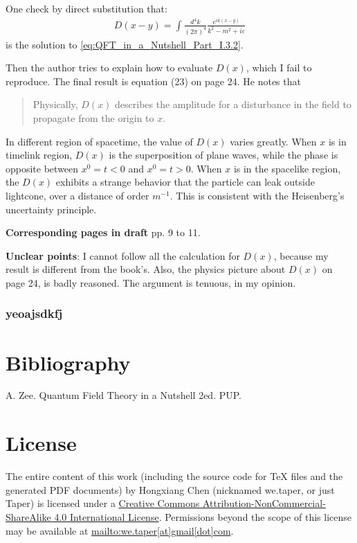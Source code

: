 \documentclass{book}
\numberwithin{equation}{subsection} %
\theoremstyle{definition}
\begin{document}
One check by direct substitution that:
\begin{align}
    D(x-y) = \int \frac{d^4k}{(2\pi)^4} 
        \frac{e^{ik(x-y)}}{k^2-m^2+i\varepsilon}
\end{align}
is the solution to \ref{eq:QFT_in_a_Nutshell_Part_I.3.2}.

Then the author tries to explain how to evaluate $D(x)$, which
I fail to reproduce. The final result is equation (23) on page 
24. He notes that
\begin{quote}
    Physically, $D(x)$ describes the amplitude for a disturbance 
    in the field to propagate from the origin to $x$. 
\end{quote}
In different region of spacetime, the value of $D(x)$ varies greatly.
When $x$ is in timelink region, $D(x)$ is the superposition of
plane waves, while the phase is opposite between $x^0=t<0$ and
$x^0=t>0$. When $x$ is in the spacelike region, the $D(x)$ exhibits
a strange behavior that the particle can leak outside lightcone,
over a distance of order $m^{-1}$. This is consistent with the
Heisenberg's uncertainty principle.

\textbf{Corresponding pages in draft} pp. 9 to 11.

\textbf{Unclear points}: I cannot follow all the calculation for 
$D(x)$, because my result is different from the book's. Also, the
physics picture about $D(x)$ on page 24, is badly reasoned. The
argument is tenuous, in my opinion.

\subsection{yeoajsdkfj}
\label{sec:yeoajsdkfj}

\chapter{Bibliography}
\begin{thebibliography}{1}
	 A. Zee. Quantum Field Theory in a Nutshell
		2ed. PUP.
\end{thebibliography}
\chapter{License}
The entire content of this work (including the source code
for TeX files and the generated PDF documents) by 
Hongxiang Chen (nicknamed we.taper, or just Taper) is
licensed under a 
\href{http://creativecommons.org/licenses/by-nc-sa/4.0/}{Creative 
	Commons Attribution-NonCommercial-ShareAlike 4.0 International 
	License}. Permissions beyond the scope of this 
license may be available at \url{mailto:we.taper[at]gmail[dot]com}.
\end{document}
